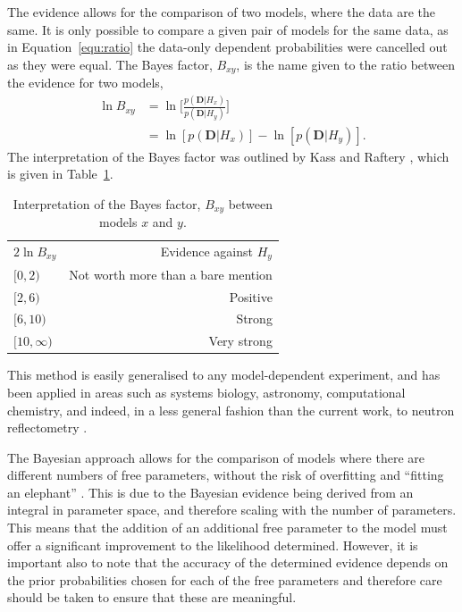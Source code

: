 \documentclass[
 reprint,
 superscriptaddress,
 amsmath,amssymb,
 aps,
]{revtex4-2}
\begin{document}
The evidence allows for the comparison of two models, where the data are the same.
It is only possible to compare a given pair of models for the same data, as in Equation~\ref{equ:ratio} the data-only dependent probabilities were cancelled out as they were equal. 
The Bayes factor, $B_{xy}$, is the name given to the ratio between the evidence for two models, 
%
\begin{equation}
    \begin{aligned}
        \ln{B_{xy}} & = \ln{\Bigg[\frac{p(\bm{D}|H_x)}{p(\bm{D}|H_y)}\Bigg]} \\
        & = \ln[p(\bm{D}|H_x)] - \ln[p(\bm{D}|H_y)]. 
    \end{aligned}
\end{equation}
The interpretation of the Bayes factor was outlined by Kass and Raftery \cite{kass_bayes_1995}, which is given in Table~\ref{tab:kass}.
%
\begin{table}
\caption{\label{tab:kass} Interpretation of the Bayes factor, $B_{xy}$ between models $x$ and $y$.}
\begin{ruledtabular}
\begin{tabular}{lr}
\textrm{$2\ln{B_{xy}}$} & Evidence against $H_y$\\
\colrule
$[0, 2)$ & Not worth more than a bare mention \\
$[2, 6)$ & Positive \\
$[6, 10)$ & Strong \\
$[10, \infty)$ & Very strong \\
\end{tabular}
\end{ruledtabular}
\end{table}
%
This method is easily generalised to any model-dependent experiment, and has been applied in areas such as systems biology, astronomy, computational chemistry, and indeed, in a less general fashion than the current work, to neutron reflectometry \cite{pullen_bayesian_2014,cornish_tests_2007,ensign_bayesian_2010,sivia_bayesian_1998}. 

The Bayesian approach allows for the comparison of models where there are different numbers of free parameters, without the risk of overfitting and ``fitting an elephant'' \cite{mayer_drawing_2010}.
This is due to the Bayesian evidence being derived from an integral in parameter space, and therefore scaling with the number of parameters. 
This means that the addition of an additional free parameter to the model must offer a significant improvement to the likelihood determined.
However, it is important also to note that the accuracy of the determined evidence depends on the prior probabilities chosen for each of the free parameters and therefore care should be taken to ensure that these are meaningful. 
\end{document}
